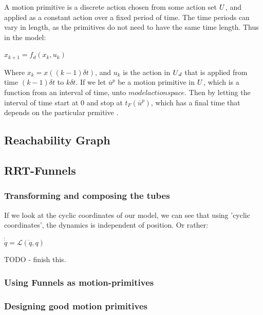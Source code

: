 A motion primitive is a discrete action chosen from some action set
\(U{}\), and applied as a constant action over a fixed period of
time. The time periods can vary in length, as the primitives do not need to have
the same time length. Thus in the model:

\begin{math}
  x_{k+1} = f_d(x_k,u_k)
\end{math} 

Where \(x_k = x((k-1)\delta{}t)\), and \(u_k\) is the action in
\(U{}_d\) that is applied from time \((k-1)\delta{}t\) to
\(k\delta{}t\). If we let \(\overline{u}^p\) be a motion primitive in
\(U{}\), which is a function from an interval of time, unto
\(modelactionspace{}\). Then by letting the interval of time start at 0 and stop
at \(t_F(\overline{u}^p)\), which has a final time that depends on the
particular prmitive \cite{LaValle09}.


\subsection{Reachability Graph}

\subsection{RRT-Funnels}


\subsubsection{Transforming and composing the tubes}

If we look at the cyclic coordinates of our model, we can see that using 'cyclic
coordinates', the dynamics is independent of position. Or rather:

\begin{math}
  \dot{\dot{q}} = \mathcal{L}(\dot{q},q)
\end{math}

TODO - finish this.


\subsubsection{Using Funnels as motion-primitives}

\subsubsection{Designing good motion primitives}